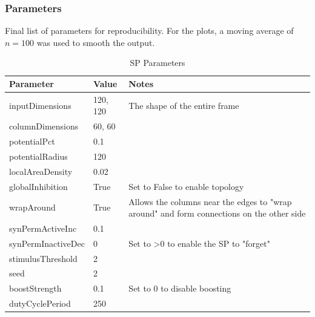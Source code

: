 \subsubsection{Parameters}
Final list of parameters for reproducibility. For the plots, a moving average of $n=100$ was used to smooth the output.
\begin{table}[H]
    \centering
    \begin{tabularx}{\linewidth}{@{}llX@{}}
        \toprule
        \textbf{Parameter} & \textbf{Value} & \textbf{Notes}                                      \\
        \midrule
        inputDimensions    & 120, 120       & The shape of the entire frame                       \\
        columnDimensions   & 60, 60         &                                                     \\
        potentialPct       & 0.1            &                                                     \\
        potentialRadius    & 120            &                                                     \\
        localAreaDensity   & 0.02           &                                                     \\
        globalInhibition   & True           & Set to False to enable topology                     \\
        wrapAround         & True           &
        Allows the columns near the edges to "wrap around" and form connections on the other side \\
        synPermActiveInc   & 0.1            &                                                     \\
        synPermInactiveDec & 0              & Set to \textgreater{}0 to enable the SP to "forget" \\
        stimulusThreshold  & 2              &                                                     \\
        seed               & 2              &                                                     \\
        boostStrength      & 0.1            & Set to 0 to disable boosting                        \\
        dutyCyclePeriod    & 250            &                                                     \\
        \bottomrule
    \end{tabularx}

    \caption{SP Parameters}
    \label{tab:bb_sp_params}
\end{table}
